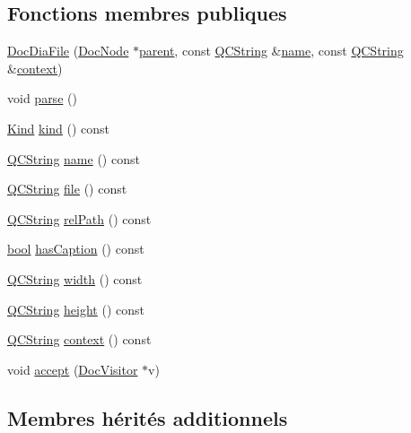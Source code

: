 \subsection*{Fonctions membres publiques}
\begin{DoxyCompactItemize}
\item 
\hyperlink{class_doc_dia_file_ae7104929c7d10268ac485a3380f32bd3}{Doc\+Dia\+File} (\hyperlink{class_doc_node}{Doc\+Node} $\ast$\hyperlink{class_doc_node_a990d8b983962776a647e6231d38bd329}{parent}, const \hyperlink{class_q_c_string}{Q\+C\+String} \&\hyperlink{class_doc_dia_file_acdcfc2feab9d55c50691a99bfe690256}{name}, const \hyperlink{class_q_c_string}{Q\+C\+String} \&\hyperlink{class_doc_dia_file_a9f712623ba1b2d6cbe2a5ccd2adc3529}{context})
\item 
void \hyperlink{class_doc_dia_file_a1c65f8a1b4672f6f0de332855eb33632}{parse} ()
\item 
\hyperlink{class_doc_node_aebd16e89ca590d84cbd40543ea5faadb}{Kind} \hyperlink{class_doc_dia_file_a5043a8fbcac2e7a8eb90728bd1e6917d}{kind} () const 
\item 
\hyperlink{class_q_c_string}{Q\+C\+String} \hyperlink{class_doc_dia_file_acdcfc2feab9d55c50691a99bfe690256}{name} () const 
\item 
\hyperlink{class_q_c_string}{Q\+C\+String} \hyperlink{class_doc_dia_file_a612145e67a4d4bdd9188110b99b04e8b}{file} () const 
\item 
\hyperlink{class_q_c_string}{Q\+C\+String} \hyperlink{class_doc_dia_file_a7d9c537518e8c6e53da3ceb54fbb08e5}{rel\+Path} () const 
\item 
\hyperlink{qglobal_8h_a1062901a7428fdd9c7f180f5e01ea056}{bool} \hyperlink{class_doc_dia_file_ae8f0f707eb5ec0c5a19fa7c5fe6b0b88}{has\+Caption} () const 
\item 
\hyperlink{class_q_c_string}{Q\+C\+String} \hyperlink{class_doc_dia_file_a738fcd392274a6410b1b8615e3eb4222}{width} () const 
\item 
\hyperlink{class_q_c_string}{Q\+C\+String} \hyperlink{class_doc_dia_file_aea31d38c45e76b915ead1610b2de1d27}{height} () const 
\item 
\hyperlink{class_q_c_string}{Q\+C\+String} \hyperlink{class_doc_dia_file_a9f712623ba1b2d6cbe2a5ccd2adc3529}{context} () const 
\item 
void \hyperlink{class_doc_dia_file_a617f514d0d0e57be3537886f827e734c}{accept} (\hyperlink{class_doc_visitor}{Doc\+Visitor} $\ast$v)
\end{DoxyCompactItemize}
\subsection*{Membres hérités additionnels}



